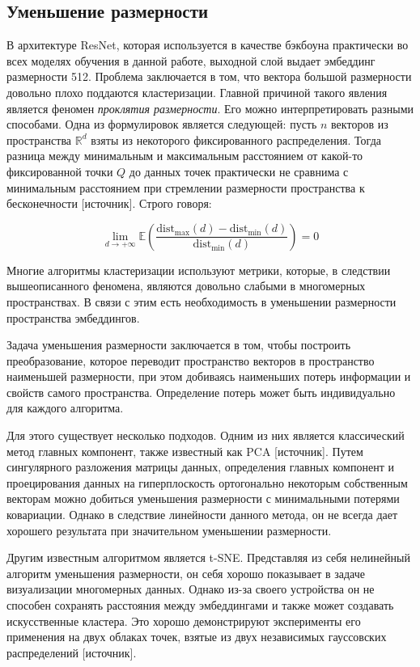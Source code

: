 \subsection{Уменьшение размерности}

В архитектуре ResNet, которая используется в качестве бэкбоуна практически во всех моделях обучения в данной работе, выходной слой выдает эмбеддинг размерности 512. Проблема заключается в том, что вектора большой размерности довольно плохо поддаются кластеризации. Главной причиной такого явления является феномен \textit{проклятия размерности}. Его можно интерпретировать разными способами. Одна из формулировок является следующей: пусть $n$ векторов из пространства $\mathbb{R}^d$ взяты из некоторого фиксированного распределения. Тогда разница между минимальным и максимальным расстоянием от какой-то фиксированной точки $Q$ до данных точек практически не сравнима с минимальным расстоянием при стремлении размерности пространства к бесконечности [источник]. Строго говоря:

$$
\lim_{d\rightarrow+\infty} \mathbb{E}\left( 
    \frac{\text{dist}_{\text{max}}(d) - \text{dist}_{\text{min}}(d)}{\text{dist}_{\text{min}}(d)}
\right) = 0
$$

\bigskip
Многие алгоритмы кластеризации используют метрики, которые, в следствии вышеописанного феномена, являются довольно слабыми в многомерных пространствах. В связи с этим есть необходимость в уменьшении размерности пространства эмбеддингов.

Задача уменьшения размерности заключается в том, чтобы построить преобразование, которое переводит пространство векторов в пространство наименьшей размерности, при этом добиваясь наименьших потерь информации и свойств самого пространства. Определение потерь может быть индивидуально для каждого алгоритма. 

Для этого существует несколько подходов. Одним из них является классический метод главных компонент, также известный как PCA [источник]. Путем сингулярного разложения матрицы данных, определения главных компонент и проецирования данных на гиперплоскость ортогонально некоторым собственным векторам можно добиться уменьшения размерности с минимальными потерями ковариации. Однако в следствие линейности данного метода, он не всегда дает хорошего результата при значительном уменьшении размерности.

Другим известным алгоритмом является t-SNE. Представляя из себя нелинейный алгоритм уменьшения размерности, он себя хорошо показывает в задаче визуализации многомерных данных. Однако из-за своего устройства он не способен сохранять расстояния между эмбеддингами и также может создавать искусственные кластера. Это хорошо демонстрируют эксперименты его применения на двух облаках точек, взятые из двух независимых гауссовских распределений [источник].

